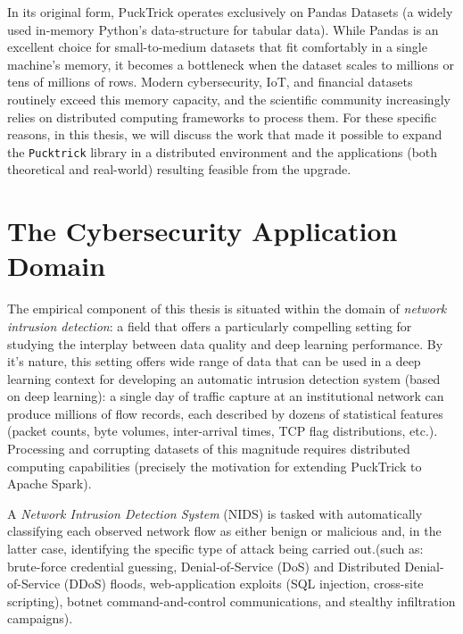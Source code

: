 \documentclass[../main.tex]{subfiles}
\begin{document}
In its original form, PuckTrick operates exclusively on Pandas Datasets (a widely used in-memory Python's data-structure for tabular data).  While Pandas is an excellent choice for small-to-medium datasets that fit comfortably in a single machine's memory, it becomes a bottleneck when the dataset scales to millions or tens of millions of rows. Modern cybersecurity, IoT, and financial datasets routinely exceed this memory capacity, and the scientific community increasingly relies on distributed computing frameworks to process them. For these specific reasons, in this thesis, we will discuss the work that made it possible to expand the \texttt{Pucktrick} library in a distributed environment and the applications (both theoretical and real-world) resulting feasible from the upgrade.

\newpage
\section{The Cybersecurity Application Domain}
\label{sec:cybersecurity-domain}

The empirical component of this thesis is situated within the domain of \emph{network intrusion detection}: a field that offers a particularly compelling setting for studying the interplay between data quality and deep learning performance.
By it's nature, this setting offers wide range of data that can be used in a deep learning context for developing an automatic intrusion detection system (based on deep learning): a single day of traffic capture at an institutional network can produce millions of flow records, each described by dozens of statistical features (packet counts, byte volumes, inter-arrival times, TCP flag distributions, etc.). Processing and corrupting datasets of this magnitude requires distributed computing capabilities (precisely the motivation for extending PuckTrick to Apache Spark).

A \emph{Network Intrusion Detection System} (NIDS) is tasked with automatically classifying each observed network flow as either benign or malicious and, in the latter case, identifying the specific type of attack being carried out.(such as: brute-force credential guessing, Denial-of-Service (DoS) and Distributed Denial-of-Service (DDoS) floods, web-application exploits (SQL injection, cross-site scripting), botnet command-and-control communications, and stealthy infiltration campaigns).
\end{document}
